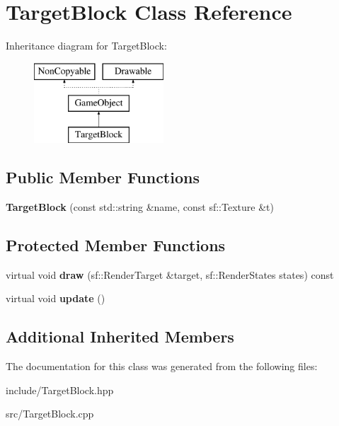\hypertarget{class_target_block}{\section{Target\-Block Class Reference}
\label{class_target_block}
}
Inheritance diagram for Target\-Block\-:\begin{figure}[H]
\begin{center}
\leavevmode
\includegraphics[height=3.000000cm]{class_target_block}
\end{center}
\end{figure}
\subsection*{Public Member Functions}
\begin{DoxyCompactItemize}
\item 
\hypertarget{class_target_block_a0d862260d9ea6052a28b87b2d93abb4d}{{\bfseries Target\-Block} (const std\-::string \&name, const sf\-::\-Texture \&t)}\label{class_target_block_a0d862260d9ea6052a28b87b2d93abb4d}

\end{DoxyCompactItemize}
\subsection*{Protected Member Functions}
\begin{DoxyCompactItemize}
\item 
\hypertarget{class_target_block_a872f6dd250b9e0904dfd90bad8bdf42a}{virtual void {\bfseries draw} (sf\-::\-Render\-Target \&target, sf\-::\-Render\-States states) const }\label{class_target_block_a872f6dd250b9e0904dfd90bad8bdf42a}

\item 
\hypertarget{class_target_block_a2c16d7dd07e04c085bbd5a7cc1151437}{virtual void {\bfseries update} ()}\label{class_target_block_a2c16d7dd07e04c085bbd5a7cc1151437}

\end{DoxyCompactItemize}
\subsection*{Additional Inherited Members}


The documentation for this class was generated from the following files\-:\begin{DoxyCompactItemize}
\item 
include/Target\-Block.\-hpp\item 
src/Target\-Block.\-cpp\end{DoxyCompactItemize}
